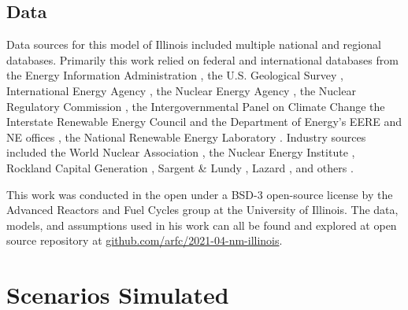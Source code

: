 \FloatBarrier
\subsection{Data}
Data sources for this model of Illinois included multiple national and regional 
databases. Primarily this work relied on federal and international databases from the 
Energy Information Administration 
\cite{us_energy_information_administration_eia_preliminary_2021,energy_information_administration_state_2020,us_energy_information_administration_eia_electric_2021,us_energy_information_administration_eia_illinois_2020}, 
the U.S. Geological Survey \cite{hoen_united_2018}, 
International Energy Agency \cite{lorenczik_projected_2020}, 
the Nuclear Energy Agency \cite{crozat_full_2018}
, the Nuclear Regulatory Commission \cite{united_states_nuclear_regulatory_commission_illinois_2020}, 
the Intergovernmental Panel on Climate Change 
\cite{intergovernmental_panel_on_climate_change_annex_2014,intergovernmental_panel_on_climate_change_climate_2014,intergovernmental_panel_on_climate_change_climate_2014-1,intergovernmental_panel_on_climate_change_climate_2014-2}
the Interstate Renewable Energy Council 
\cite{sherwood_us_2009,sherwood_us_2010,sherwood_us_2011,brown_solid_1996,sherwood_us_2012,sherwood_us_2013,sherwood_us_2014}
and the Department of Energy's EERE and NE offices 
\cite{us_department_of_energy_capital_2016}, the National Renewable Energy 
Laboratory \cite{nrel_national_renewable_energy_laboratory_2020_2020}.
Industry sources included the World Nuclear Association
\cite{world_nuclear_association_nuclear_2017}
, 
the Nuclear Energy Institute 
\cite{desai_nuclear_2018,desai_nuclear_2020,murphy_impacts_2019,tessum_air_2019},
Rockland Capital Generation \cite{rockland_capital_natural_2021},
Sargent \& Lundy \cite{sargent__lundy_capital_2020}, 
Lazard \cite{ray_lazards_2020},
and others 
\cite{the_solar_foundation_national_2020,solar_energy_industries_association_illinois_2020,rutovitz_calculating_2015}.


This work was conducted in the open under a BSD-3 open-source license by the 
Advanced Reactors and Fuel Cycles group at the University of Illinois. The 
data, models, and assumptions used in his work can all be found and explored at 
open source repository at 
\href{https://github.com/arfc/2021-04-nm-illinois}{github.com/arfc/2021-04-nm-illinois}.

\FloatBarrier
\section{Scenarios Simulated}\label{sec:simulations}

